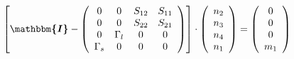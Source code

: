 \[ \left[ \boldsymbol{\mathbbm{I}}  - \left(\begin{array}{cccc} 0 & 0
& S_{12} & S_{11} \\ 0 & 0 & S_{22} & S_{21} \\ 0 & \Gamma_l & 0 & 0
\\ \Gamma_s & 0 & 0 & 0 \end{array}\right)\right] \cdot
\left(\begin{array}{c} n_{2} \\ n_{3} \\ n_{4} \\ n_{1}
\end{array}\right) = \left(\begin{array}{c} 0 \\ 0 \\ 0 \\ m_{1}
\end{array}\right) \]
